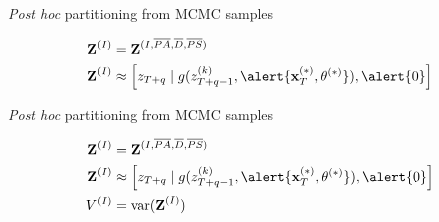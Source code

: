 \documentclass[12pt, compress, aspectratio=1610]{beamer}
\begin{document}
\begin{frame}{%
\protect\hypertarget{partitioning-from-mcmc-samples-3}{%
\emph{Post hoc} partitioning from MCMC samples}}

\begin{align*}
\textbf{Z}^{(I)} &= \textbf{Z}^{(I,\overline{PA},\overline{D},\overline{PS})} \\
\textbf{Z}^{(I)} &\approx \left[z_{T+q} \; | \; g(z_{T+q-1}^{(k)}, \alert{\textbf{x}^{(\ast)}_T, \boldmath{\theta}^{(\ast)}}), \alert{0} \right]
\end{align*}

\end{frame}

\begin{frame}{%
\protect\hypertarget{partitioning-from-mcmc-samples-4}{%
\emph{Post hoc} partitioning from MCMC samples}}

\begin{align*}
\textbf{Z}^{(I)} &= \textbf{Z}^{(I,\overline{PA},\overline{D},\overline{PS})} \\
\textbf{Z}^{(I)} &\approx \left[z_{T+q} \; | \; g(z_{T+q-1}^{(k)}, \alert{\textbf{x}^{(\ast)}_T, \boldmath{\theta}^{(\ast)}}), \alert{0} \right] \\
V^{(I)} &= \text{var}(\textbf{Z}^{(I)})
\end{align*}

\end{frame}
\end{document}
